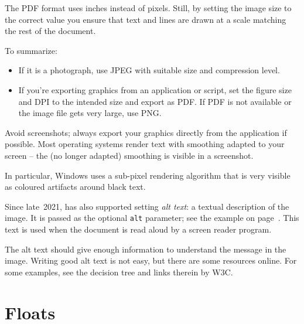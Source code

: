The PDF format uses inches instead of pixels.
Still, by setting the image size to the correct value you ensure that
text and lines are drawn at a scale matching the rest of the document.


\begin{practices}
To summarize:
\begin{itemize}
\item If it is a photograph, use JPEG with suitable size and compression level.
\item If you're exporting graphics from an application or script,
    set the figure size and DPI to the intended size and export as PDF.
    If PDF is not available or the image file gets very large, use PNG.
\end{itemize}
\end{practices}


\begin{practices}
Avoid screenshots;
always export your graphics directly from the application if possible.
Most operating systems render text with smoothing adapted to your screen
-- the (no longer adapted) smoothing is visible in a screenshot.

In particular, Windows uses a sub-pixel rendering algorithm
that is very visible as coloured artifacts around black text.
\end{practices}


\begin{latexthree}
Since late~2021, 
has also supported setting \emph{alt text}: a textual description of the image.
It is passed as the optional \verb|alt| parameter;
see the example on page~\pageref{ex:alt text}.
This text is used when the document is read aloud by a screen reader program.

The alt text should give enough information to understand the message in the image.
Writing good alt text is not easy,
but there are some resources online.
For some examples, see the decision tree and links therein by W3C\footnotemark.
\end{latexthree}



%
%
%
\section{Floats}

